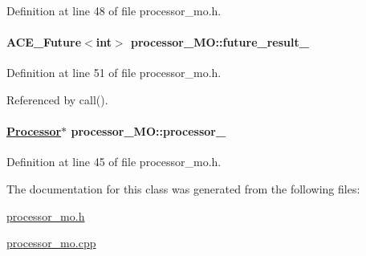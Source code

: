 Definition at line 48 of file processor\_\-mo.h.\hypertarget{classprocessor__MO_processor__MOo2}{
\paragraph[future\_\-result\_\-]{\setlength{\rightskip}{0pt plus 5cm}ACE\_\-Future$<$int$>$ processor\_\-MO::future\_\-result\_\-}\hfill}
\label{classprocessor__MO_processor__MOo2}




Definition at line 51 of file processor\_\-mo.h.

Referenced by call().\hypertarget{classprocessor__MO_processor__MOo0}{
\paragraph[processor\_\-]{\setlength{\rightskip}{0pt plus 5cm}\hyperlink{classProcessor}{Processor}$\ast$ processor\_\-MO::processor\_\-}\hfill}
\label{classprocessor__MO_processor__MOo0}




Definition at line 45 of file processor\_\-mo.h.

The documentation for this class was generated from the following files:\begin{CompactItemize}
\item 
\hyperlink{processor__mo_8h}{processor\_\-mo.h}\item 
\hyperlink{processor__mo_8cpp}{processor\_\-mo.cpp}\end{CompactItemize}
